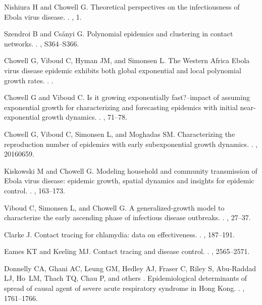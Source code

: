 \documentclass[12pt]{article}
\begin{document}
\begin{thebibliography}{10}
Nishiura H and Chowell G.
 Theoretical perspectives on the infectiousness of {Ebola} virus
  disease.
.
, 1.

Szendroi B and Cs{\'a}nyi G.
 Polynomial epidemics and clustering in contact networks.
.
, S364--S366.

Chowell G, Viboud C, Hyman JM, and Simonsen L.
 {The Western Africa} {Ebola} virus disease epidemic exhibits
  both global exponential and local polynomial growth rates.
.
.

Chowell G and Viboud C.
 Is it growing exponentially fast?--impact of assuming
  exponential growth for characterizing and forecasting epidemics with initial
  near-exponential growth dynamics.
.
, 71--78.

Chowell G, Viboud C, Simonsen L, and Moghadas SM.
 Characterizing the reproduction number of epidemics with early
  subexponential growth dynamics.
.
, 20160659.

Kiskowski M and Chowell G.
 Modeling household and community transmission of {Ebola} virus
  disease: epidemic growth, spatial dynamics and insights for epidemic control.
.
, 163--173.

Viboud C, Simonsen L, and Chowell G.
 A generalized-growth model to characterize the early ascending
  phase of infectious disease outbreaks.
.
, 27--37.

Clarke J.
 Contact tracing for chlamydia: data on effectiveness.
.
, 187--191.

Eames KT and Keeling MJ.
 Contact tracing and disease control.
.
, 2565--2571.

Donnelly CA, Ghani AC, Leung GM, Hedley AJ, Fraser C, Riley S, Abu-Raddad LJ,
  Ho~LM, Thach TQ, Chau P, and others .
 Epidemiological determinants of spread of causal agent of severe
  acute respiratory syndrome in {Hong Kong}.
.
, 1761--1766.


\end{thebibliography}
\end{document}
